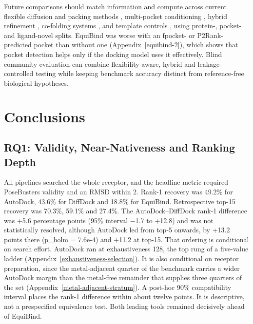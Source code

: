 Future comparisons should match information and compute across current flexible diffusion and packing methods \cite{ref031}, multi-pocket conditioning \cite{ref066}, hybrid refinement \cite{ref064}, co-folding systems \cite{ref012}, \cite{ref069} and template controls \cite{ref065}, using protein-, pocket- and ligand-novel splits. EquiBind was worse with an fpocket- or P2Rank-predicted pocket than without one (Appendix~\ref{equibind-2}), which shows that pocket detection helps only if the docking model uses it effectively. Blind community evaluation can combine flexibility-aware, hybrid and leakage-controlled testing \cite{ref047} while keeping benchmark accuracy distinct from reference-free biological hypotheses.

\hypertarget{conclusions}{%
\chapter{\texorpdfstring{Conclusions }{Conclusions }}\label{conclusions}}

\hypertarget{rq1-quality-and-stability}{%
\section{RQ1: Validity, Near-Nativeness and Ranking Depth}\label{rq1-quality-and-stability}}

All pipelines searched the whole receptor, and the headline metric required PoseBusters validity and an RMSD within 2\angstrom{}. Rank-1 recovery was 49.2\% for AutoDock, 43.6\% for DiffDock and 18.8\% for EquiBind. Retrospective top-15 recovery was 70.3\%, 59.1\% and 27.4\%. The AutoDock--DiffDock rank-1 difference was +5.6 percentage points (95\% interval \ensuremath{-}1.7 to +12.8) and was not statistically resolved, although AutoDock led from top-5 onwards, by +13.2 points there (p\_holm = 7.6e-4) and +11.2 at top-15. That ordering is conditional on search effort. AutoDock ran at exhaustiveness 128, the top rung of a five-value ladder (Appendix~\ref{exhaustiveness-selection}). It is also conditional on receptor preparation, since the metal-adjacent quarter of the benchmark carries a wider AutoDock margin than the metal-free remainder that supplies three quarters of the set (Appendix~\ref{metal-adjacent-stratum}). A post-hoc 90\% compatibility interval places the rank-1 difference within about twelve points. It is descriptive, not a prespecified equivalence test. Both leading tools remained decisively ahead of EquiBind.


